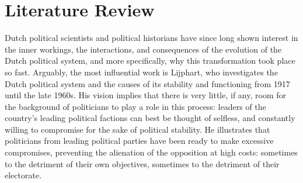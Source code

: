 \section{Literature Review}

    Dutch political scientists and political historians have since long shown interest in the inner workings, the interactions, and consequences of the evolution of the Dutch political system, and more specifically, why this transformation took place so fast. Arguably, the most influential work is Lijphart, who investigates the Dutch political system and the causes of its stability and functioning from 1917 until the late 1960s.\autocite{lijphart1975politics} His vision implies that there is very little, if any, room for the background of politicians to play a role in this process: leaders of the country’s leading political factions can best be thought of selfless, and constantly willing to compromise for the sake of political stability. He illustrates that politicians from leading political parties have been ready to make excessive compromises, preventing the alienation of the opposition at high costs: sometimes to the detriment of their own objectives, sometimes to the detriment of their electorate. %

